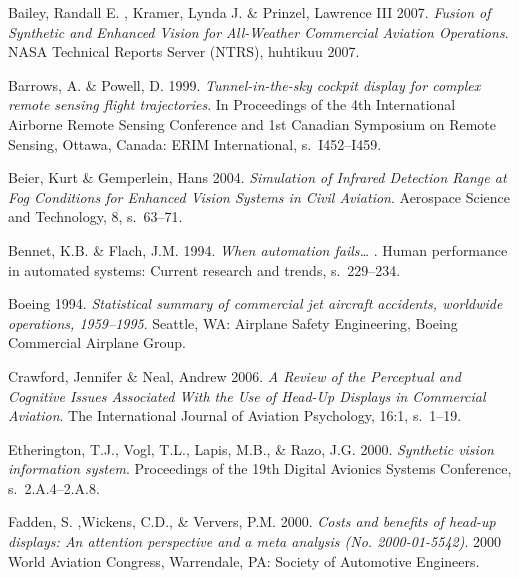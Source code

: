\documentclass[utf8,bachelor,manualbib]{gradu3}
\begin{document}

\begin{thebibliography}{}

Bailey, Randall E. , Kramer, Lynda J. \& Prinzel, Lawrence III 2007.
\textit{Fusion of Synthetic and Enhanced Vision for All-Weather Commercial Aviation Operations}.
NASA Technical Reports Server (NTRS), huhtikuu 2007.

Barrows, A. \& Powell, D. 1999.
\textit{Tunnel-in-the-sky cockpit display for complex remote sensing flight
trajectories}.
In Proceedings of the 4th International Airborne Remote Sensing Conference and 1st
Canadian Symposium on Remote Sensing, Ottawa, Canada: ERIM International, s.~I452--I459.

Beier, Kurt \& Gemperlein, Hans 2004.
\textit{Simulation of Infrared Detection Range at Fog Conditions for Enhanced Vision Systems in Civil Aviation}.
Aerospace Science and Technology, 8, s.~63--71.

Bennet, K.B. \& Flach, J.M. 1994.
\textit{When automation fails… }.
Human performance in automated systems: Current research and trends, s.~229--234.

Boeing 1994.
\textit{Statistical summary of commercial jet aircraft accidents, worldwide operations, 1959–1995}.
Seattle, WA: Airplane Safety Engineering, Boeing Commercial Airplane Group.

Crawford, Jennifer \& Neal, Andrew 2006.
\textit{A Review of the Perceptual and Cognitive Issues Associated With the Use of Head-Up Displays in Commercial Aviation}.
The International Journal of Aviation Psychology, 16:1, s.~1--19.

Etherington, T.J., Vogl, T.L., Lapis, M.B., \& Razo, J.G. 2000.
\textit{Synthetic vision information system}.
Proceedings of the 19th Digital Avionics Systems Conference, s.~2.A.4--2.A.8.

Fadden, S. ,Wickens, C.D., \& Ververs, P.M. 2000.
\textit{Costs and benefits of head-up displays: An attention
perspective and a meta analysis (No. 2000-01-5542)}.
2000 World Aviation Congress, Warrendale, PA: Society of Automotive Engineers.


\end{thebibliography}
\end{document}
